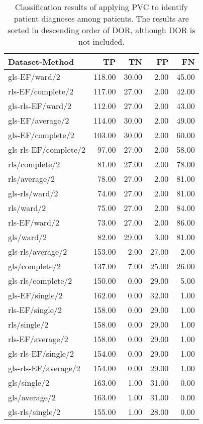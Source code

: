 \begin{longtable}{lrrrr}
    \caption{Classification results of applying PVC to identify patient diagnoses among patients.
             The results are sorted in descending order of DOR, although DOR is not included.}
    \label{tab:tsc_hf_raw_results}
    \hline
    Dataset-Method        &     TP &    TN &    FP &    FN \\
    \hline
    gls-EF/ward/2         & 118.00 & 30.00 &  2.00 & 45.00 \\
    rls-EF/complete/2     & 117.00 & 27.00 &  2.00 & 42.00 \\
    gls-rls-EF/ward/2     & 112.00 & 27.00 &  2.00 & 43.00 \\
    gls-EF/average/2      & 114.00 & 30.00 &  2.00 & 49.00 \\
    gls-EF/complete/2     & 103.00 & 30.00 &  2.00 & 60.00 \\
    gls-rls-EF/complete/2 &  97.00 & 27.00 &  2.00 & 58.00 \\
    rls/complete/2        &  81.00 & 27.00 &  2.00 & 78.00 \\
    rls/average/2         &  78.00 & 27.00 &  2.00 & 81.00 \\
    gls-rls/ward/2        &  74.00 & 27.00 &  2.00 & 81.00 \\
    rls/ward/2            &  75.00 & 27.00 &  2.00 & 84.00 \\
    rls-EF/ward/2         &  73.00 & 27.00 &  2.00 & 86.00 \\
    gls/ward/2            &  82.00 & 29.00 &  3.00 & 81.00 \\
    gls-rls/average/2     & 153.00 &  2.00 & 27.00 &  2.00 \\
    gls/complete/2        & 137.00 &  7.00 & 25.00 & 26.00 \\
    gls-rls/complete/2    & 150.00 &  0.00 & 29.00 &  5.00 \\
    gls-EF/single/2       & 162.00 &  0.00 & 32.00 &  1.00 \\
    rls-EF/single/2       & 158.00 &  0.00 & 29.00 &  1.00 \\
    rls/single/2          & 158.00 &  0.00 & 29.00 &  1.00 \\
    rls-EF/average/2      & 158.00 &  0.00 & 29.00 &  1.00 \\
    gls-rls-EF/single/2   & 154.00 &  0.00 & 29.00 &  1.00 \\
    gls-rls-EF/average/2  & 154.00 &  0.00 & 29.00 &  1.00 \\
    gls/single/2          & 163.00 &  1.00 & 31.00 &  0.00 \\
    gls/average/2         & 163.00 &  1.00 & 31.00 &  0.00 \\
    gls-rls/single/2      & 155.00 &  1.00 & 28.00 &  0.00 \\
    \hline
\end{longtable}
